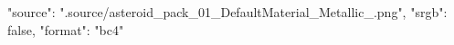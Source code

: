 {
    "source": ".source/asteroid_pack_01_DefaultMaterial_Metallic_.png",
    "srgb": false,
    "format": "bc4"
}
